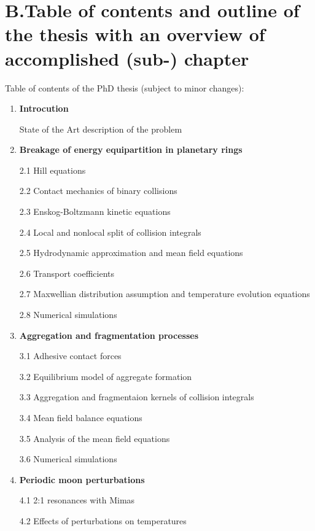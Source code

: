 \documentclass[11pt, notitlepage]{article} %
\begin{document}

\spa
\section*{B.Table of contents and outline of the thesis with an overview of accomplished (sub-) chapter}
Table of contents of the PhD thesis (subject to minor changes):
\begin{enumerate}
	\item \textbf{Introcution}
	
		State of the Art description of the problem
	
	\item \textbf{Breakage of energy equipartition in planetary rings}
	
		2.1 Hill equations

		2.2 Contact mechanics of binary collisions

		2.3 Enskog-Boltzmann kinetic equations

		2.4 Local and nonlocal split of collision integrals 

		2.5 Hydrodynamic approximation and mean field equations

		2.6 Transport coefficients

		2.7 Maxwellian distribution assumption and temperature evolution equations

		2.8 Numerical simulations

	\item \textbf{Aggregation and fragmentation processes}
	
		3.1 Adhesive contact forces 

		3.2 Equilibrium model of aggregate formation 

		3.3 Aggregation and fragmentaion kernels of collision integrals 

		3.4 Mean field balance equations

		3.5 Analysis of the mean field equations

		3.6 Numerical simulations

	\item \textbf{Periodic moon perturbations}
	
		4.1 2:1 resonances with Mimas 

		4.2 Effects of perturbations on temperatures


\end{enumerate}
\end{document}
